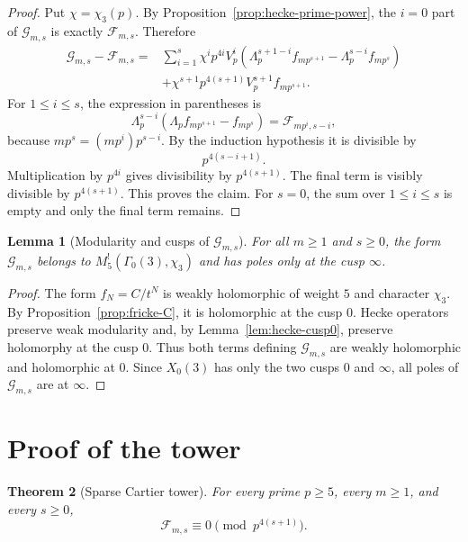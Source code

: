 \documentclass[11pt]{amsart}
\newtheorem{theorem}{Theorem}[section]
\newtheorem{lemma}[theorem]{Lemma}
\theoremstyle{remark}
\newcommand{\G}{\Gamma_0(3)}
\newcommand{\Up}{\Lambda_p}
\newcommand{\Vp}{V_p}
\begin{document}
\begin{proof}
Put $\chi=\chi_3(p)$.  By Proposition~\ref{prop:hecke-prime-power}, the $i=0$ part of $\mathcal G_{m,s}$ is exactly $\mathcal F_{m,s}$.  Therefore
\[
\begin{aligned}
 \mathcal G_{m,s}-\mathcal F_{m,s}
 ={}&\sum_{i=1}^{s}\chi^ip^{4i}\Vp^i
 \left(\Up^{s+1-i}f_{mp^{s+1}}-\Up^{s-i}f_{mp^s}\right)\\
 &+\chi^{s+1}p^{4(s+1)}\Vp^{s+1}f_{mp^{s+1}}.
\end{aligned}
\]
For $1\le i\le s$, the expression in parentheses is
\[
 \Up^{s-i}\left(\Up f_{mp^{s+1}}-f_{mp^s}\right)
 =\mathcal F_{mp^i,s-i},
\]
because $mp^s=(mp^i)p^{s-i}$.  By the induction hypothesis it is divisible by
\[
 p^{4(s-i+1)}.
\]
Multiplication by $p^{4i}$ gives divisibility by $p^{4(s+1)}$.  The final term is visibly divisible by $p^{4(s+1)}$.  This proves the claim.  For $s=0$, the sum over $1\le i\le s$ is empty and only the final term remains.
\end{proof}

\begin{lemma}[Modularity and cusps of $\mathcal G_{m,s}$]\label{lem:G-cusps}
For all $m\ge1$ and $s\ge0$, the form $\mathcal G_{m,s}$ belongs to $M_5^!(\G,\chi_3)$ and has poles only at the cusp $\infty$.
\end{lemma}

\begin{proof}
The form $f_N=C/t^N$ is weakly holomorphic of weight $5$ and character $\chi_3$.  By Proposition~\ref{prop:fricke-C}, it is holomorphic at the cusp $0$.  Hecke operators preserve weak modularity and, by Lemma~\ref{lem:hecke-cusp0}, preserve holomorphy at the cusp $0$.  Thus both terms defining $\mathcal G_{m,s}$ are weakly holomorphic and holomorphic at $0$.  Since $X_0(3)$ has only the two cusps $0$ and $\infty$, all poles of $\mathcal G_{m,s}$ are at $\infty$.
\end{proof}

\section{Proof of the tower}\label{sec:proof}

\begin{theorem}[Sparse Cartier tower]\label{thm:sparse-tower}
For every prime $p\ge5$, every $m\ge1$, and every $s\ge0$,
\[
 \mathcal F_{m,s}\equiv0\pmod {p^{4(s+1)}}.
\]
\end{theorem}
\end{document}
